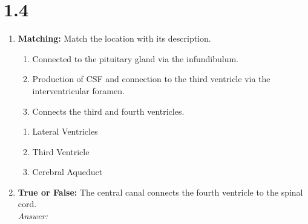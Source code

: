 \section*{1.4}
\begin{enumerate}[label=\textbf{Q1.4.\arabic*}]
      \item \textbf{Matching:} Match the location with its description.
            \begin{wordbox}
                  \begin{enumerate}[label=(\roman*)]
                        \item Connected to the pituitary gland via the infundibulum.
                        \item Production of CSF and connection to the third ventricle via the interventricular foramen.
                        \item Connects the third and fourth ventricles.
                  \end{enumerate}
            \end{wordbox}
            \begin{enumerate}[label=(\alph*)]
                  \item Lateral Ventricles \quad \dotfill \quad \underline{\hspace{3cm}}\\[0.5em]
                  \item Third Ventricle \quad \dotfill \quad \underline{\hspace{3cm}}\\[0.5em]
                  \item Cerebral Aqueduct \quad \dotfill \quad \underline{\hspace{3cm}}
            \end{enumerate}

      \item \textbf{True or False:} The central canal connects the fourth ventricle to the spinal cord. \\
            \textit{Answer:} %
\end{enumerate}
\squigglyline
